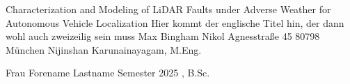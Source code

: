 \documentclass[%
FTMstudentthesis,
optArial,
optBiber,
optGerman,
optCMYK
]{FTMlatex}%
\begin{document}
%

\FTMPreText%



\FTMstudentthesisTitlePageFTMDesignBachelorsThesis
{Characterization and Modeling of LiDAR Faults under Adverse Weather for Autonomous Vehicle Localization}
{Hier kommt der englische Titel hin, der dann wohl auch zweizeilig sein muss}
{Max Bingham Nikol \vskip0pt Agnesstraße 45 \vskip0pt 80798 München}
{\FTMnamesProfLienkamp}
{Nijinshan Karunainayagam, M.Eng.}
{}
{}%

%

\FTMstudentthesisForms
{Frau}
{Forename}
{Lastname}
{}
{}
{Semester}
{2025}
{, B.Sc.}

\FTMPrintTableOfContents%
%
\listoftodos%

\FTMMainText%

%
%
%
%
%
%

\FTMPostText%


\begin{appendices}%
    \FTMAppendix%
    \FTMPrintTableOfAppendix%
\end{appendices}%
\end{document}
